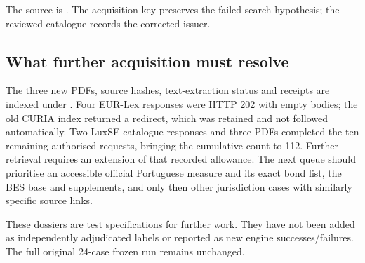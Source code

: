 The source is
.
The acquisition key preserves the failed search hypothesis; the reviewed
catalogue records the corrected issuer.

\subsection{What further acquisition must resolve}

The three new PDFs, source hashes, text-extraction status and receipts are indexed
under . Four EUR-Lex responses
were HTTP 202 with empty bodies; the old CURIA index returned a redirect,
which was retained and not followed automatically. Two LuxSE catalogue
responses and three PDFs completed the ten remaining authorised requests,
bringing the cumulative count to 112. Further retrieval requires an extension
of that recorded allowance. The next queue should prioritise an accessible
official Portuguese measure and its exact bond list, the BES base and
supplements, and only then other jurisdiction cases with similarly specific
source links.

These dossiers are test specifications for further work. They have not been
added as independently adjudicated labels or reported as new engine
successes/failures. The full original 24-case frozen run remains unchanged.
